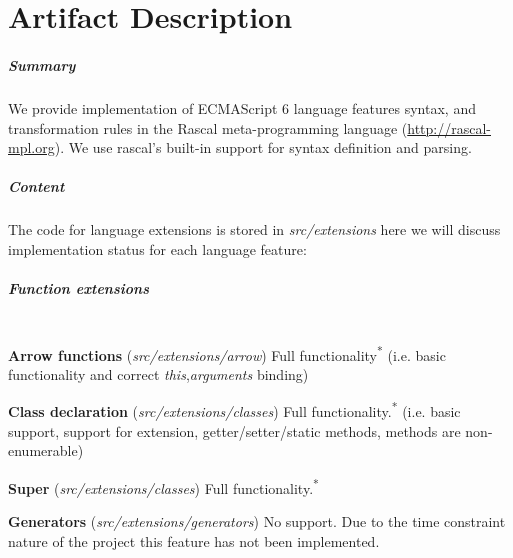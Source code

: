 
\chapter{Artifact Description} %

\label{AppendixA} %


\paragraph{Summary}
We provide implementation of ECMAScript 6 language features syntax, and transformation rules in the Rascal meta-programming language (\url{http://rascal-mpl.org}). We use rascal's built-in support for syntax definition and parsing.

\paragraph{Content}
The code for language extensions is stored in \textit{src/extensions} here we will discuss implementation status for each language feature:

\paragraph{Function extensions}\mbox{}\\
\textbf{Arrow functions} (\textit{src/extensions/arrow}) \newline
Full functionality\textsuperscript{*} (i.e. basic functionality and correct \textit{this},\textit{arguments} binding)

\textbf{Class declaration} (\textit{src/extensions/classes}) \newline
Full functionality.\textsuperscript{*} (i.e. basic support, support for extension, getter/setter/static methods, methods are non-enumerable)

\textbf{Super} (\textit{src/extensions/classes}) \newline
Full functionality.\textsuperscript{*}

\textbf{Generators} (\textit{src/extensions/generators}) \newline
No support. Due to the time constraint nature of the project this feature has not been implemented. 

